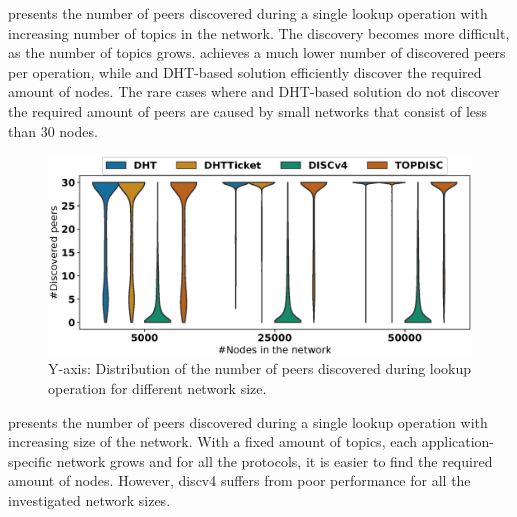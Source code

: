  presents the number of peers discovered during a single lookup operation with increasing number of topics in the network. The discovery becomes more difficult, as the number of topics grows.  \discv achieves a much lower number of discovered peers per operation, while \sysname and DHT-based solution efficiently discover the required amount of nodes. The rare cases where \sysname and DHT-based solution do not discover the required amount of peers are caused by small networks that consist of less than 30 nodes. 


\begin{figure}[!h]
\includegraphics[width=\linewidth]{results/efficiency/violin_size_discovered.eps}
\caption{Y-axis: Distribution of the number of peers discovered during lookup operation for different network size.}
\label{fig:discoveredPerSize}
\end{figure}

 presents the number of peers discovered during a single lookup operation with increasing size of the network. With a fixed amount of topics, each application-specific network grows and for all the protocols, it is easier to find the required amount of nodes. However, discv4 suffers from poor performance for all the investigated network sizes. 

